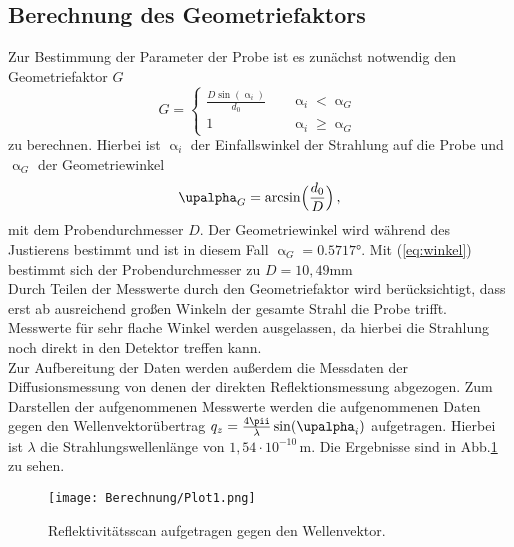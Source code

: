 \subsection{Berechnung des Geometriefaktors}
Zur Bestimmung der Parameter der Probe ist es zunächst notwendig den Geometriefaktor $G$
\begin{equation}
  G =
     \begin{cases}
       \frac{D\sin\left(\upalpha_i\right)}{d_0} &\quad\upalpha_i<\upalpha_G\\
       1 &\quad\upalpha_i\geq\upalpha_G
     \end{cases}
\end{equation}
zu berechnen. Hierbei ist $\upalpha_i$ der Einfallswinkel der Strahlung auf die Probe und $\upalpha_G$ der Geometriewinkel
\begin{equation}
\upalpha_G=\arcsin\Bigl(\frac{d_0}{D}\Bigr)\,,
\label{eq:winkel}
\end{equation}
mit dem Probendurchmesser $D$.
Der Geometriewinkel wird während des Justierens bestimmt und ist in diesem Fall $\upalpha_G=0.5717°$.
Mit (\ref{eq:winkel}) bestimmt sich der Probendurchmesser zu $D=10{,}49\si{\mm}$\\
Durch Teilen der Messwerte durch den Geometriefaktor wird berücksichtigt, dass erst ab ausreichend großen Winkeln der gesamte Strahl die Probe trifft. Messwerte für sehr flache Winkel werden ausgelassen, da hierbei die Strahlung noch direkt in den Detektor treffen kann.\\
Zur Aufbereitung der Daten werden außerdem die Messdaten der Diffusionsmessung von denen der direkten Reflektionsmessung abgezogen. Zum Darstellen der aufgenommenen Messwerte werden die aufgenommenen Daten gegen den Wellenvektorübertrag $q_z=\frac{4\pii}{\lambda}\sin(\upalpha_i)$ aufgetragen. Hierbei ist $\lambda$ die Strahlungswellenlänge von $1{,}54\cdot10^{-10}\,\si{\m}$. Die Ergebnisse sind in Abb.\ref{Plot1} zu sehen.
\begin{figure}[H]
  \centering
  \texttt{[image: Berechnung/Plot1.png]}
  \caption{Reflektivitätsscan aufgetragen gegen den Wellenvektor.}
  \label{Plot1}
\end{figure}
